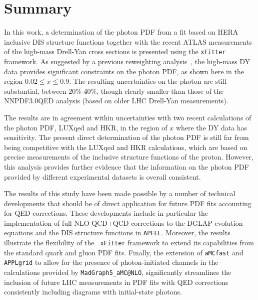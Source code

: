 \section{Summary}
\label{sec:conclusions}

%
In this work, a determination of the photon PDF from
a fit based on HERA inclusive DIS structure functions together with
the recent ATLAS measurements of the high-mass Drell-Yan cross
sections is presented using the {\tt xFitter} framework.
%
As suggested by a previous reweighting analysis~\cite{Aad:2016zzw}, the
high-mass DY data provides significant constraints on the photon PDF,
as shown here in the region $0.02 \le x \le 0.9$.
%
The resulting uncertainties on the photon are still substantial,
between 20\%-40\%, though clearly smaller than those of the
NNPDF3.0QED analysis (based on older LHC Drell-Yan measurements).

The results are in agreement within uncertainties with two recent
calculations of the photon PDF, LUXqed and HKR, in the region of $x$
where the DY data has sensitivity.
%
The present direct determination of the
photon PDF is still far from being competitive with the LUXqed and HKR
calculations, which are based on precise measurements of the inclusive
structure functions of the proton.
%
However, this analysis provides further evidence that the information
on the photon PDF provided by different experimental datasets is
overall consistent.

The results of this study have been made possible by a number of
technical developments that should be of direct application for future
PDF fits accounting for QED corrections.
%
These developments include in particular the implementation of full NLO
QCD+QCD corrections to the DGLAP evolution equations and the DIS
structure functions in {\tt APFEL}.
%
Moreover, the results illustrate the flexibility of the {\tt
  xFitter} framework to extend its capabilities from the standard
quark and gluon PDF fits.
%
Finally, the extension of {\tt aMCfast} and {\tt APPLgrid} to allow
for the presence of photon-initiated channels in the calculations
provided by {\tt MadGraph5\_aMC@NLO}, significantly streamlines the
inclusion of future LHC measurements in PDF fits with QED corrections
consistently including diagrams with initial-state photons.

